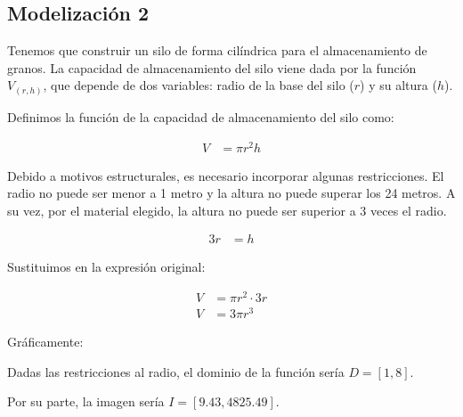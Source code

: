 \subsection*{Modelización 2}

Tenemos que construir un silo de forma cilíndrica para el almacenamiento de granos. La capacidad de almacenamiento del silo viene dada por la función $V_{(r, h)}$, que depende de dos variables: radio de la base del silo ($r$) y su altura ($h$).

\begin{center}
\end{center}

Definimos la función de la capacidad de almacenamiento del silo como:

\begin{align*}
    V &= \pi r^2h
\end{align*}

Debido a motivos estructurales, es necesario incorporar algunas restricciones. El radio no puede ser menor a 1 metro y la altura no puede superar los 24 metros. A su vez, por el material elegido, la altura no puede ser superior a 3 veces el radio. 

\begin{align*}
    3r &= h
\end{align*}

Sustituimos en la expresión original:

\begin{align*}
    V &= \pi r^2 \cdot 3r\\
    V &= 3 \pi r^3
\end{align*}

Gráficamente:

\begin{center}
\end{center}

Dadas las restricciones al radio, el dominio de la función sería $D = [1, 8]$.

Por su parte, la imagen sería $I = [9.43, 4825.49]$.
